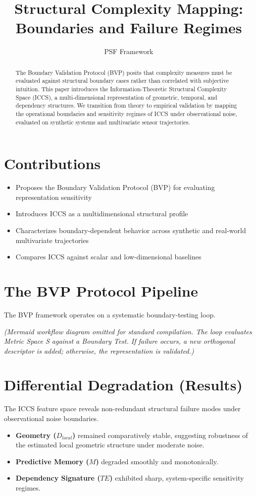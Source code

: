 \documentclass[11pt,a4paper]{article}
\title{Structural Complexity Mapping: Boundaries and Failure Regimes}
\author{PSF Framework}
\date{}
\begin{document}
\maketitle

\begin{abstract}
The Boundary Validation Protocol (BVP) posits that complexity measures must be evaluated against structural boundary cases rather than correlated with subjective intuition. This paper introduces the Information-Theoretic Structural Complexity Space (ICCS), a multi-dimensional representation of geometric, temporal, and dependency structures. We transition from theory to empirical validation by mapping the operational boundaries and sensitivity regimes of ICCS under observational noise, evaluated on synthetic systems and multivariate sensor trajectories.
\end{abstract}

\section*{Contributions}
\begin{itemize}
    \item Proposes the Boundary Validation Protocol (BVP) for evaluating representation sensitivity
    \item Introduces ICCS as a multidimensional structural profile
    \item Characterizes boundary-dependent behavior across synthetic and real-world multivariate trajectories
    \item Compares ICCS against scalar and low-dimensional baselines
\end{itemize}

\section{The BVP Protocol Pipeline}
The BVP framework operates on a systematic boundary-testing loop. 

\textit{(Mermaid workflow diagram omitted for standard compilation. The loop evaluates Metric Space S against a Boundary Test. If failure occurs, a new orthogonal descriptor is added; otherwise, the representation is validated.)}

\section{Differential Degradation (Results)}
The ICCS feature space reveals non-redundant structural failure modes under observational noise boundaries. 
\begin{itemize}
    \item \textbf{Geometry ($D_{local}$)} remained comparatively stable, suggesting robustness of the estimated local geometric structure \cite{Facco2017} under moderate noise.
    \item \textbf{Predictive Memory ($M$)} degraded smoothly and monotonically.
    \item \textbf{Dependency Signature ($TE$)} \cite{Schreiber2000} exhibited sharp, system-specific sensitivity regimes.
\end{itemize}
\end{document}
